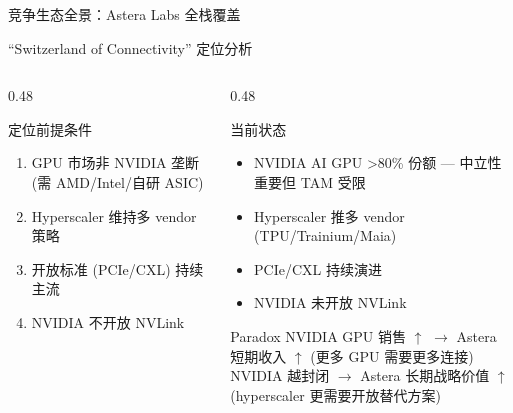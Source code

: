 \documentclass[aspectratio=169, 10pt, UTF8]{ctexbeamer}
\begin{document}
\begin{frame}{竞争生态全景：Astera Labs 全栈覆盖}
\end{frame}

\begin{frame}{``Switzerland of Connectivity'' 定位分析}
  \begin{columns}[T]
    \begin{column}{0.48\textwidth}
      \begin{block}{定位前提条件}
        \begin{enumerate}
          \item GPU 市场非 NVIDIA 垄断 (需 AMD/Intel/自研 ASIC)
          \item Hyperscaler 维持多 vendor 策略
          \item 开放标准 (PCIe/CXL) 持续主流
          \item NVIDIA 不开放 NVLink
        \end{enumerate}
      \end{block}
    \end{column}
    \begin{column}{0.48\textwidth}
      \begin{exampleblock}{当前状态}
        \begin{itemize}
          \item NVIDIA AI GPU >80\% 份额 — 中立性重要但 TAM 受限
          \item Hyperscaler 推多 vendor (TPU/Trainium/Maia) \checkmark
          \item PCIe/CXL 持续演进 \checkmark
          \item NVIDIA 未开放 NVLink \checkmark
        \end{itemize}
      \end{exampleblock}

      \begin{alertblock}{Paradox}
        NVIDIA GPU 销售 $\uparrow$ $\to$ Astera 短期收入 $\uparrow$ (更多 GPU 需要更多连接)\\
        NVIDIA 越封闭 $\to$ Astera 长期战略价值 $\uparrow$ (hyperscaler 更需要开放替代方案)
      \end{alertblock}
    \end{column}
  \end{columns}
\end{frame}
\end{document}
